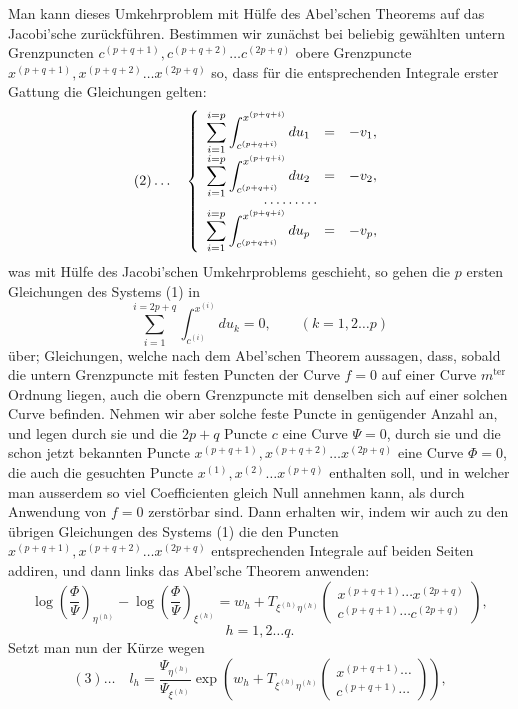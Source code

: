 \documentclass[10pt]{article}
\begin{document}
Man kann dieses Umkehrproblem mit Hülfe des Abel'schen Theorems auf das Jacobi'sche zurückführen. Bestimmen wir zunächst bei beliebig gewählten untern Grenzpuncten \(c^{(p+q+1)},c^{(p+q+2)}\ldots c^{(2p+q)}\) obere Grenzpuncte \(x^{(p+q+1)},x^{(p+q+2)}\ldots x^{(2p+q)}\) so, dass für die entsprechenden Integrale erster Gattung die Gleichungen gelten:
\[
(2)\ldots\quad
\left\{\begin{array}{rcl}
\displaystyle\sum_{i=1}^{i=p}\int_{c^{(p+q+i)}}^{x^{(p+q+i)}}du_1&=&-v_1,\\
\displaystyle\sum_{i=1}^{i=p}\int_{c^{(p+q+i)}}^{x^{(p+q+i)}}du_2&=&-v_2,\\[-0.2em]
\multicolumn{3}{c}{\cdots\cdots\cdots}\\[-0.2em]
\displaystyle\sum_{i=1}^{i=p}\int_{c^{(p+q+i)}}^{x^{(p+q+i)}}du_p&=&-v_p,
\end{array}\right.
\]
was mit Hülfe des Jacobi'schen Umkehrproblems geschieht, so gehen die \(p\) ersten Gleichungen des Systems (1) in
\[
\sum_{i=1}^{i=2p+q}\int_{c^{(i)}}^{x^{(i)}}du_k=0,\qquad(k=1,2\ldots p)
\]
über; Gleichungen, welche nach dem Abel'schen Theorem aussagen, dass, sobald die untern Grenzpuncte mit festen Puncten der Curve \(f=0\) auf einer Curve \(m^{\mathrm{ter}}\) Ordnung liegen, auch die obern Grenzpuncte mit denselben sich auf einer solchen Curve befinden. Nehmen wir aber solche feste Puncte in genügender Anzahl an, und legen durch sie und die \(2p+q\) Puncte \(c\) eine Curve \(\Psi=0\), durch sie und die schon jetzt bekannten Puncte \(x^{(p+q+1)},x^{(p+q+2)}\ldots x^{(2p+q)}\) eine Curve \(\Phi=0\), die auch die gesuchten Puncte \(x^{(1)},x^{(2)}\ldots x^{(p+q)}\) enthalten soll, und in welcher man ausserdem so viel Coefficienten gleich Null annehmen kann, als durch Anwendung von \(f=0\) zerstörbar sind. Dann erhalten wir, indem wir auch zu den übrigen Gleichungen des Systems (1) die den Puncten \(x^{(p+q+1)},x^{(p+q+2)}\ldots x^{(2p+q)}\) entsprechenden Integrale auf beiden Seiten addiren, und dann links das Abel'sche Theorem anwenden:
\[
\log\left(\frac{\Phi}{\Psi}\right)_{\eta^{(h)}}-
\log\left(\frac{\Phi}{\Psi}\right)_{\xi^{(h)}}
=w_h+T_{\xi^{(h)}\eta^{(h)}}\begin{pmatrix}x^{(p+q+1)}\cdots x^{(2p+q)}\\c^{(p+q+1)}\cdots c^{(2p+q)}\end{pmatrix},
\]
\[
h=1,2\ldots q.
\]
Setzt man nun der Kürze wegen
\[
(3)\ldots\quad
l_h=\frac{\Psi_{\eta^{(h)}}}{\Psi_{\xi^{(h)}}}
\exp\!\left(w_h+T_{\xi^{(h)}\eta^{(h)}}\begin{pmatrix}x^{(p+q+1)}\cdots\\c^{(p+q+1)}\cdots\end{pmatrix}\right),
\]
\end{document}
